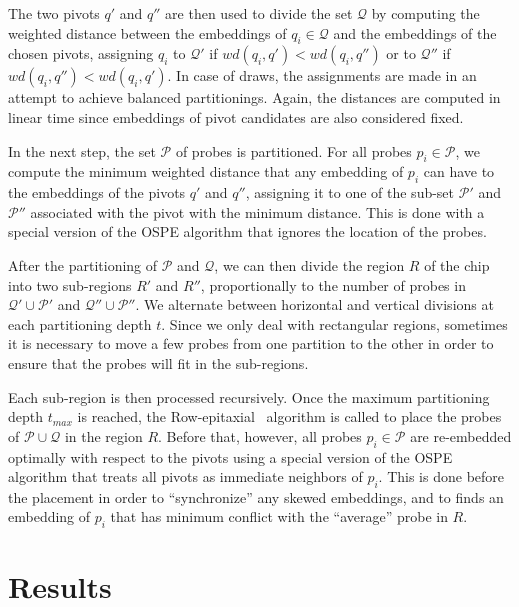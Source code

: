 \documentclass[runningheads]{llncs}
\begin{document}
The two pivots $q'$ and $q''$ are then used to divide the set $\mathcal{Q}$
by computing the weighted distance between the embeddings of $q_i \in \mathcal{Q}$
and the embeddings of the chosen pivots, assigning $q_i$ to $\mathcal{Q}'$ if
$wd(q_i, q') < wd(q_i, q'')$ or to $\mathcal{Q}''$ if $wd(q_i, q'') < wd(q_i, q')$.
In case of draws, the assignments are made in an attempt to
achieve balanced partitionings. Again, the distances are computed in linear time
since embeddings of pivot candidates are also considered fixed.

In the next step, the set $\mathcal{P}$ of probes is partitioned. For all probes
$p_i \in \mathcal{P}$, we compute the minimum weighted distance that any embedding
of $p_i$ can have to the embeddings of the pivots $q'$ and $q''$, assigning it to
one of the sub-set $\mathcal{P}'$ and $\mathcal{P}''$ associated with the pivot
with the minimum distance. This is done with a special version of the OSPE algorithm
that ignores the location of the probes.

After the partitioning of $\mathcal{P}$ and $\mathcal{Q}$, we can then divide the
region $R$ of the chip into two sub-regions $R'$ and $R''$, proportionally to the
number of probes in $\mathcal{Q}' \cup \mathcal{P}'$ and $\mathcal{Q}'' \cup \mathcal{P}''$.
We alternate between horizontal and vertical divisions at each partitioning depth $t$.
Since we only deal with rectangular regions, sometimes it is necessary to move
a few probes from one partition to the other in order to ensure that the probes
will fit in the sub-regions.

Each sub-region is then processed recursively. Once the maximum partitioning depth
$t_{max}$ is reached, the Row-epitaxial~\cite{KAHNG03A} algorithm is
called to place the probes of $\mathcal{P} \cup \mathcal{Q}$ in the region $R$.
Before that, however, all probes $p_i \in \mathcal{P}$ are re-embedded optimally
with respect to the pivots using a special version of the OSPE algorithm that treats
all pivots as immediate neighbors of $p_i$. This is done before the placement in
order to ``synchronize'' any skewed embeddings, and to finds an embedding of
$p_i$ that has minimum conflict with the ``average'' probe in $R$.

\section{Results}
\label{sec:results}
\end{document}
